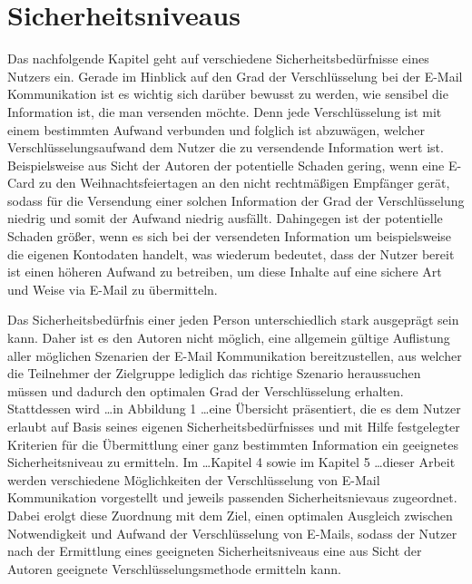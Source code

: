 \chapter{Sicherheitsniveaus}

Das nachfolgende Kapitel geht auf verschiedene Sicherheitsbedürfnisse eines Nutzers ein. Gerade im Hinblick auf den Grad der Verschlüsselung bei der E-Mail Kommunikation ist es wichtig sich darüber bewusst zu werden, wie sensibel die Information ist, die man versenden möchte. Denn jede Verschlüsselung ist mit einem bestimmten Aufwand verbunden und folglich ist abzuwägen, welcher Verschlüsselungsaufwand dem Nutzer die zu versendende Information wert ist. 
Beispielsweise aus Sicht der Autoren der potentielle Schaden gering, wenn eine E-Card zu den Weihnachtsfeiertagen an den nicht rechtmäßigen Empfänger gerät, sodass für die Versendung einer solchen Information der Grad der Verschlüsselung niedrig und somit der Aufwand niedrig ausfällt. Dahingegen ist der potentielle Schaden größer, wenn es sich bei der versendeten Information um beispielsweise die eigenen Kontodaten handelt, was wiederum bedeutet, dass der Nutzer bereit ist einen höheren Aufwand zu betreiben, um diese Inhalte auf eine sichere Art und Weise via E-Mail zu übermitteln.


Das Sicherheitsbedürfnis einer jeden Person unterschiedlich stark ausgeprägt sein kann. Daher ist es den Autoren nicht möglich, eine allgemein gültige Auflistung aller möglichen Szenarien der E-Mail Kommunikation bereitzustellen, aus welcher die Teilnehmer der Zielgruppe lediglich das richtige Szenario heraussuchen müssen und dadurch den optimalen Grad der Verschlüsselung erhalten. Stattdessen wird \dots in Abbildung 1 \dots eine Übersicht präsentiert, die es dem Nutzer erlaubt auf Basis seines eigenen Sicherheitsbedürfnisses und mit Hilfe festgelegter Kriterien für die Übermittlung einer ganz bestimmten Information ein geeignetes Sicherheitsniveau zu ermitteln. Im \dots Kapitel 4 sowie im Kapitel 5 \dots  dieser Arbeit werden verschiedene Möglichkeiten der Verschlüsselung von E-Mail Kommunikation vorgestellt und jeweils passenden Sicherheitsnievaus zugeordnet. Dabei erolgt diese Zuordnung mit dem Ziel, einen optimalen Ausgleich zwischen Notwendigkeit und Aufwand der Verschlüsselung von E-Mails, sodass der Nutzer nach der Ermittlung eines geeigneten Sicherheitsniveaus eine aus Sicht der Autoren geeignete Verschlüsselungsmethode ermitteln kann.

